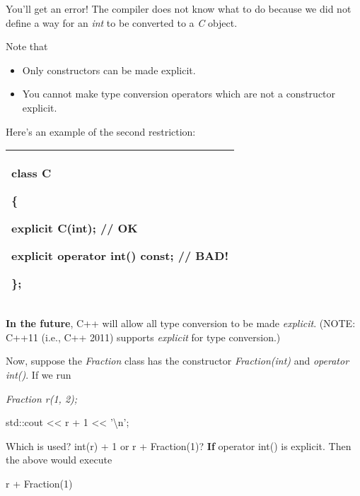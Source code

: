 \documentclass[
]{article}
\providecommand{\tightlist}{%
  \setlength{\itemsep}{0pt}\setlength{\parskip}{0pt}}
\begin{document}
You'll get an error! The compiler does not know what to do because we
did not define a way for an \emph{int} to be converted to a \emph{C}
object.

Note that

\begin{itemize}
\tightlist
\item
  Only constructors can be made explicit.
\item
  You cannot make type conversion operators which are not a constructor
  explicit.
\end{itemize}

Here's an example of the second restriction:

\begin{longtable}[]{@{}l@{}}
\toprule
\endhead
\begin{minipage}[t]{0.97\columnwidth}\raggedright
class C

\{

explicit C(int); // OK

\textbf{ explicit} operator int() const; // \textbf{BAD!}

\};\strut
\end{minipage}\tabularnewline
\bottomrule
\end{longtable}

\textbf{In the future}, C++ will allow all type conversion to be made
\emph{explicit}. (NOTE: C++11 (i.e., C++ 2011) supports \emph{explicit}
for type conversion.)

Now, suppose the \emph{Fraction} class has the constructor
\emph{Fraction(int)} and \emph{operator int()}. If we run

\emph{Fraction r(1, 2); }

std::cout \textless\textless{} r + 1 \textless\textless{}
'\textbackslash n';

Which is used? int(r) + 1 or r + Fraction(1)? \textbf{If} operator int()
is explicit. Then the above would execute

r + Fraction(1)
\end{document}
